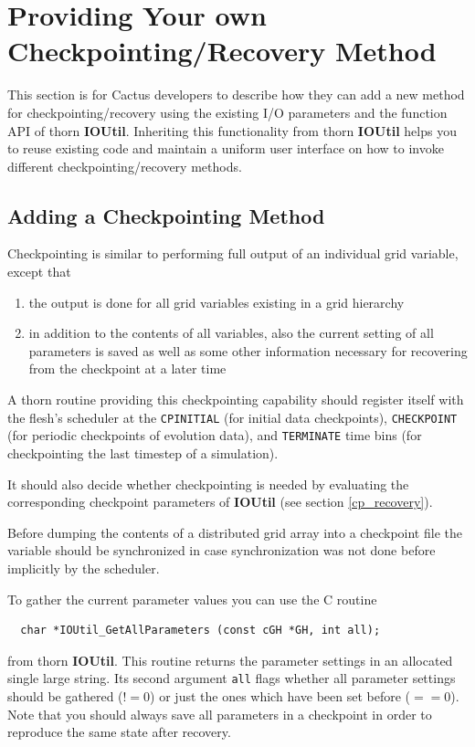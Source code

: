 \documentclass{article}
\begin{document}
\section{Providing Your own Checkpointing/Recovery Method}

This section is for Cactus developers to describe how they can add a new method
for checkpointing/recovery using the existing I/O parameters and the function
API of thorn {\bf IOUtil}.
Inheriting this functionality from thorn {\bf IOUtil} helps you to reuse
existing code and maintain a uniform user interface on how to invoke different
checkpointing/recovery methods.

\subsection{Adding a Checkpointing Method}

Checkpointing is similar to performing full output of an individual grid
variable, except that

\begin{enumerate}
  \item the output is done for all grid variables existing in a grid hierarchy
  \item in addition to the contents of all variables, also the current setting
    of all parameters is saved as well as some other information necessary for
    recovering from the checkpoint at a later time
\end{enumerate}

A thorn routine providing this checkpointing capability should register itself
with the flesh's scheduler at the {\tt CPINITIAL} (for initial data
checkpoints), {\tt CHECKPOINT} (for periodic checkpoints of evolution
data), and {\tt TERMINATE} time bins (for checkpointing the last timestep
of a simulation).

It should also decide whether checkpointing is needed by evaluating the
corresponding checkpoint parameters of {\bf IOUtil} (see section
\ref{cp_recovery}).

Before dumping the contents of a distributed grid array into a checkpoint
file the variable should be synchronized in case synchronization was not done before
implicitly by the scheduler.

To gather the current parameter values you can use the C routine
\begin{verbatim}
  char *IOUtil_GetAllParameters (const cGH *GH, int all);
\end{verbatim}
from thorn {\bf IOUtil}. This routine returns the parameter settings in an
allocated single large string. Its second argument {\tt all} flags whether all
parameter settings should be gathered ($!= 0$) or just the ones which have been
set before ($== 0$). Note that you should always save all parameters in a
checkpoint in order to reproduce the same state after recovery.
\end{document}
